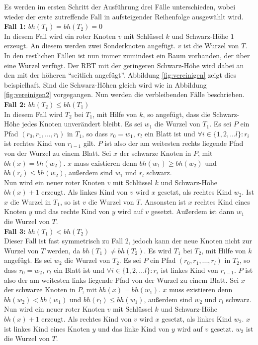 \documentclass[a4paper,12pt]{article}
\begin{document}
Es werden im ersten Schritt der Ausführung drei Fälle unterschieden, wobei wieder der erste zutreffende Fall in aufsteigender Reihenfolge ausgewählt wird. \\
\noindent\textbf{Fall 1: $bh(T_1) = bh(T_2) = 0$ }\\   
In diesem Fall wird ein roter Knoten $v$ mit Schlüssel $k$ und Schwarz-Höhe $1$ erzeugt. An diesem werden zwei Sonderknoten angefügt. $v$ ist die Wurzel von $T$. \\
In den restlichen Fällen ist nun immer zumindest ein Baum vorhanden, der über eine Wurzel verfügt. Der RBT mit der geringeren Schwarz-Höhe wird dabei an den mit der höheren \enquote{seitlich angefügt}. Abbildung \ref{fig:vereinigen} zeigt dies beispielhaft. Sind die Schwarz-Höhen gleich wird wie in Abbildung \ref{fig:vereinigen2} vorgegangen. Nun werden die verbleibenden Fälle beschrieben.\\
\noindent\textbf{Fall 2: $bh(T_2) \leq bh(T_1)$ }\\
In diesem Fall wird $T_2$ bei $T_1$, mit Hilfe von $k$, so angefügt, dass die Schwarz-Höhe jedes Knoten unverändert bleibt. Es sei $w_1$ die Wurzel von $T_1$. Es sei $P$ ein Pfad $(r_0,r_1,...,r_l)$ in $T_1$, so dass $r_0 = w_1$, $r_l$ ein Blatt ist und $\forall i \in \{1,2,...l\} \colon r_i$  ist rechtes Kind von  $r_{i-1}$ gilt. $P$ ist also der am weitesten rechts liegende Pfad von der Wurzel zu einem Blatt. Sei $x$ der schwarze Knoten in $P$, mit $\mathit{bh}(x) = \mathit{bh}(w_2)$. $x$ muss existieren denn $\mathit{bh}(w_1) \geq \mathit{bh}(w_2)$ und $\mathit{bh}(r_l) \leq  \mathit{bh}(w_2)$, außerdem sind $w_1$ und $r_l$ schwarz.\\
Nun wird ein neuer roter Knoten $v$ mit Schlüssel $k$ und Schwarz-Höhe $\mathit{bh}(x) + 1$ erzeugt. Als linkes Kind von $v$  wird $x$ gesetzt, als rechtes Kind $w_2$. Ist $x$ die Wurzel in $T_1$, so ist $v$ die Wurzel von $T$. Ansonsten ist $x$ rechtes Kind eines Knoten $y$ und das rechte Kind von $y$ wird auf $v$ gesetzt. Außerdem ist dann $w_1$ die Wurzel von $T$.     \\  
\noindent\textbf{Fall 3: $bh(T_1) < bh(T_2)$ }\\ 
Dieser Fall ist fast symmetrisch zu Fall 2, jedoch kann der neue Knoten nicht zur Wurzel von $T$ werden, da $bh(T_1) \neq bh(T_2)$.
Es wird $T_1$ bei $T_2$, mit Hilfe von $k$ angefügt. Es sei $w_2$ die Wurzel von $T_2$. Es sei $P$ ein Pfad $(r_0,r_1,...,r_l)$ in $T_2$, so dass $r_0 = w_2$, $r_l$ ein Blatt ist und $\forall i \in \{1,2,...l\} \colon r_i$  ist linkes Kind von  $r_{i-1}$. $P$ ist also der am weitesten links liegende Pfad von der Wurzel zu einem Blatt. Sei $x$ der schwarze Knoten in $P$, mit $\mathit{bh}(x) = \mathit{bh}(w_1)$. $x$ muss existieren denn $\mathit{bh}(w_2) < \mathit{bh}(w_1)$ und $\mathit{bh}(r_l) \leq  \mathit{bh}(w_1)$, außerdem sind $w_2$ und $r_l$ schwarz. Nun wird ein neuer roter Knoten $v$ mit Schlüssel $k$ und Schwarz-Höhe $\mathit{bh}(x) + 1$ erzeugt. Als rechtes Kind von $v$  wird $x$ gesetzt, als linkes Kind $w_2$. $x$ ist linkes Kind eines Knoten $y$ und das linke Kind von $y$ wird auf $v$ gesetzt. $w_2$ ist die Wurzel von $T$. \\   
\end{document}
